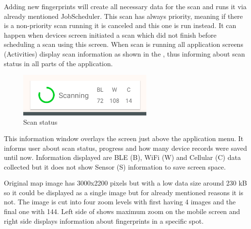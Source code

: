 Adding new fingerprints will create all necessary data for the scan and runs it via already mentioned JobScheduler. This scan has always priority, meaning if there is a non-priority scan running it is canceled and this one is run instead. It can happen when devices screen initiated a scan which did not finish before scheduling a scan using this screen. When scan is running all application screens (Activities) display scan information as shown in the , thus informing about scan status in all parts of the application.

\begin{figure}[H]
	\begin{centering}
		\includegraphics[width=0.6\textwidth]{img/scan_status}
		\par\end{centering}
	\caption{Scan status}
	\label{fig05c05}
\end{figure}

This information window overlays the screen just above the application menu. It informs user about scan status, progress and how many device records were saved until now. Information displayed are BLE (B), WiFi (W) and Cellular (C) data collected but it does not show Sensor (S) information to save screen space.

Original map image has 3000x2200 pixels but with a low data size around 230 kB so it could be displayed as a single image but for already mentioned reasons it is not. The image is cut into four zoom levels with first having 4 images and the final one with 144. Left side of  shows maximum zoom on the mobile screen and right side displays information about fingerprints in a specific spot.

